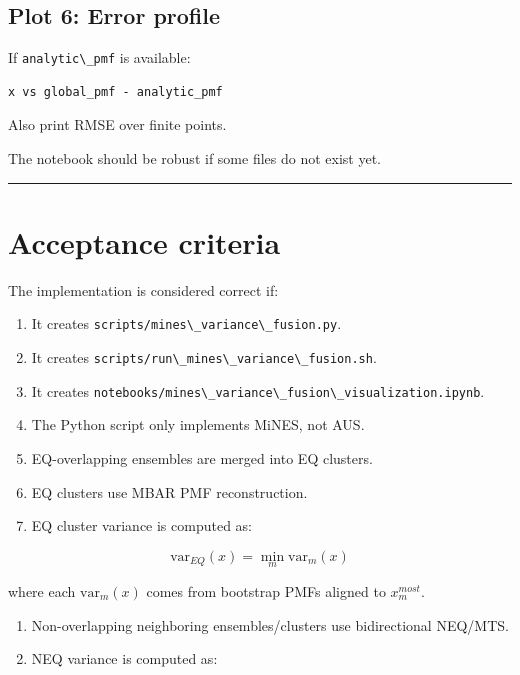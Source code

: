 \documentclass[
  10.5pt,
]{article}
\newcommand{\passthrough}[1]{#1}
\providecommand{\tightlist}{%
  \setlength{\itemsep}{0pt}\setlength{\parskip}{0pt}}
\begin{document}
\subsection{Plot 6: Error profile}\label{plot-6-error-profile}

If \passthrough{\lstinline!analytic\_pmf!} is available:

\begin{lstlisting}
x vs global_pmf - analytic_pmf
\end{lstlisting}

Also print RMSE over finite points.

The notebook should be robust if some files do not exist yet.

\begin{center}\rule{0.5\linewidth}{0.5pt}\end{center}

\section{Acceptance criteria}\label{acceptance-criteria}

The implementation is considered correct if:

\begin{enumerate}
\def\labelenumi{\arabic{enumi}.}
\tightlist
\item
  It creates
  \passthrough{\lstinline!scripts/mines\_variance\_fusion.py!}.
\item
  It creates
  \passthrough{\lstinline!scripts/run\_mines\_variance\_fusion.sh!}.
\item
  It creates
  \passthrough{\lstinline!notebooks/mines\_variance\_fusion\_visualization.ipynb!}.
\item
  The Python script only implements MiNES, not AUS.
\item
  EQ-overlapping ensembles are merged into EQ clusters.
\item
  EQ clusters use MBAR PMF reconstruction.
\item
  EQ cluster variance is computed as:
\end{enumerate}

\[
\mathrm{var}_{EQ}(x)=\min_m \mathrm{var}_m(x)
\]

where each \(\mathrm{var}_m(x)\) comes from bootstrap PMFs aligned to
\(x^{most}_m\).

\begin{enumerate}
\def\labelenumi{\arabic{enumi}.}
\setcounter{enumi}{7}
\tightlist
\item
  Non-overlapping neighboring ensembles/clusters use bidirectional
  NEQ/MTS.
\item
  NEQ variance is computed as:
\end{enumerate}
\end{document}
